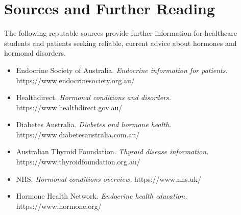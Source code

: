 \section*{Sources and Further Reading}
The following reputable sources provide further information for healthcare students and patients seeking reliable, current advice about hormones and hormonal disorders.

\begin{itemize}
    \item Endocrine Society of Australia. \textit{Endocrine information for patients.} https://www.endocrinesociety.org.au/
    \item Healthdirect. \textit{Hormonal conditions and disorders.} https://www.healthdirect.gov.au/
    \item Diabetes Australia. \textit{Diabetes and hormone health.} https://www.diabetesaustralia.com.au/
    \item Australian Thyroid Foundation. \textit{Thyroid disease information.} https://www.thyroidfoundation.org.au/
    \item NHS. \textit{Hormonal conditions overview.} https://www.nhs.uk/
    \item Hormone Health Network. \textit{Endocrine health education.} https://www.hormone.org/
\end{itemize}
